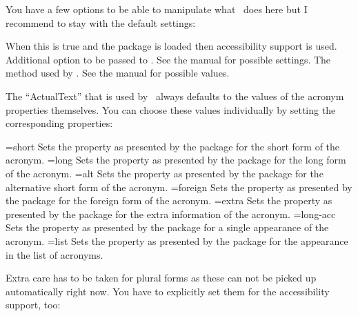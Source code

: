 \documentclass{acro-manual}
\begin{document}
You have a few options to be able to manipulate what \acro\ does here but I
recommend to stay with the default settings:
\begin{options}
    When this is true and the package  is loaded then
    accessibility support is used.
   \Default
    Additional option to be passed to .  See the
     manual for possible settings.
    The method used by .  See the
     manual for possible values.
\end{options}

The \enquote{ActualText} that is used by \acro\ always defaults to the values
of the acronym properties themselves.  You can choose these values
individually by setting the corresponding properties:
\begin{properties}
  \Default={short}
    Sets the  property as presented by the 
    package for the short form of the acronym.
  \Default={long}
    Sets the  property as presented by the 
    package for the long form of the acronym.
  \Default={alt}
    Sets the  property as presented by the 
    package for the alternative short form of the acronym.
  \Default={foreign}
    Sets the  property as presented by the 
    package for the foreign form of the acronym.
  \Default={extra}
    Sets the  property as presented by the 
    package for the extra information of the acronym.
  \Default={long-acc}
    Sets the  property as presented by the 
    package for a single appearance of the acronym.
  \Default={list}
    Sets the  property as presented by the 
    package for the appearance in the list of acronyms.
\end{properties}

Extra care has to be taken for plural forms as these can not be picked up
automatically right now.  You have to explicitly set them for the
accessibility support, too:
\begin{sourcecode}
\end{sourcecode}
\end{document}
